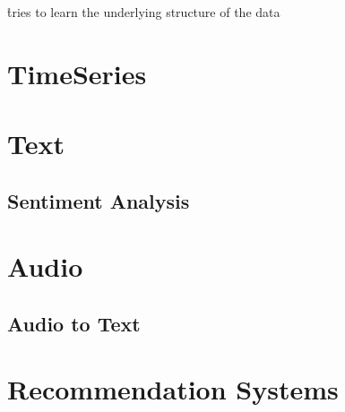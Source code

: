 \r{tries to learn the underlying structure of the data}



\section{TimeSeries}

\section{Text}

\subsection{Sentiment Analysis}

\section{Audio}

\subsection{Audio to Text}

\section{Recommendation Systems}

